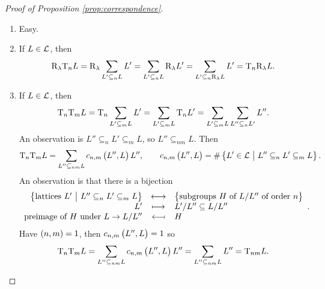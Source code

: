 \begin{proof}[Proof of Proposition \ref{prop:correspondence}]
\hfill
\begin{enumerate}
\item Easy.
\item If $ L \in \mathcal{L} $, then
$$ \mathrm{R}_\lambda\mathrm{T}_nL = \mathrm{R}_\lambda\sum_{L' \subseteq_n L} L' = \sum_{L' \subseteq_n L} \mathrm{R}_\lambda L' = \sum_{L' \subseteq_n \mathrm{R}_\lambda L} L' = \mathrm{T}_n\mathrm{R}_\lambda L. $$
\item If $ L \in \mathcal{L} $, then
$$ \mathrm{T}_n\mathrm{T}_mL = \mathrm{T}_n\sum_{L' \subseteq_m L} L' = \sum_{L' \subseteq_m L} \mathrm{T}_nL' = \sum_{L' \subseteq_m L} \sum_{L'' \subseteq_n L'} L''. $$
An observation is $ L'' \subseteq_n L' \subseteq_m L $, so $ L'' \subseteq_{nm} L $. Then
$$ \T_n\T_mL = \sum_{L'' \subseteq_{nm} L} c_{n, m}\br{L'', L}L'', \qquad c_{n, m}\br{L'', L} = \#\cbr{L' \in \LLL \st L'' \subseteq_n L' \subseteq_m L}. $$
An observation is that there is a bijection
$$ \bijection{\cbr{\text{lattices} \ L' \st L'' \subseteq_n L' \subseteq_m L}}{\cbr{\text{subgroups} \ H \ \text{of} \ L / L'' \ \text{of order} \ n}}{L'}{L' / L'' \subseteq L / L''}{\text{preimage of} \ H \ \text{under} \ L \to L / L''}{H}. $$
Have $ \br{n, m} = 1 $, then $ c_{n, m}\br{L'', L} = 1 $ so
$$ \T_n\T_mL = \sum_{L'' \subseteq_{nm} L} c_{n, m}\br{L'', L}L'' = \sum_{L'' \subseteq_{nm} L} L'' = \T_{nm}L. $$

\pagebreak


\end{enumerate}
\end{proof}

